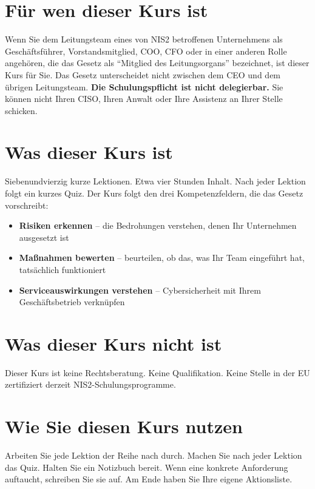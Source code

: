 \documentclass[11pt,a4paper,twoside]{book}
\begin{document}
\section*{Für wen dieser Kurs ist}

Wenn Sie dem Leitungsteam eines von NIS2 betroffenen Unternehmens als Geschäftsführer, Vorstandsmitglied, COO, CFO oder in einer anderen Rolle angehören, die das Gesetz als ``Mitglied des Leitungsorgans'' bezeichnet, ist dieser Kurs für Sie. Das Gesetz unterscheidet nicht zwischen dem CEO und dem übrigen Leitungsteam. \textbf{Die Schulungspflicht ist nicht delegierbar.} Sie können nicht Ihren CISO, Ihren Anwalt oder Ihre Assistenz an Ihrer Stelle schicken.

\section*{Was dieser Kurs ist}

Siebenundvierzig kurze Lektionen. Etwa vier Stunden Inhalt. Nach jeder Lektion folgt ein kurzes Quiz. Der Kurs folgt den drei Kompetenzfeldern, die das Gesetz vorschreibt:
\begin{itemize}
  \item \textbf{Risiken erkennen} -- die Bedrohungen verstehen, denen Ihr Unternehmen ausgesetzt ist
  \item \textbf{Maßnahmen bewerten} -- beurteilen, ob das, was Ihr Team eingeführt hat, tatsächlich funktioniert
  \item \textbf{Serviceauswirkungen verstehen} -- Cybersicherheit mit Ihrem Geschäftsbetrieb verknüpfen
\end{itemize}

\section*{Was dieser Kurs nicht ist}

Dieser Kurs ist keine Rechtsberatung. Keine Qualifikation. Keine Stelle in der EU zertifiziert derzeit NIS2-Schulungsprogramme.

\section*{Wie Sie diesen Kurs nutzen}

Arbeiten Sie jede Lektion der Reihe nach durch. Machen Sie nach jeder Lektion das Quiz. Halten Sie ein Notizbuch bereit. Wenn eine konkrete Anforderung auftaucht, schreiben Sie sie auf. Am Ende haben Sie Ihre eigene Aktionsliste.
\end{document}
